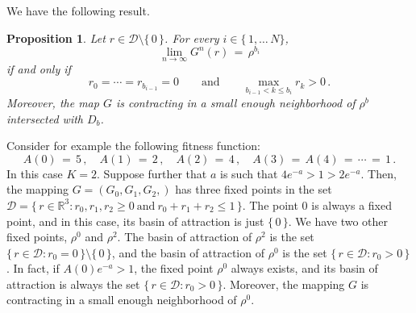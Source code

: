 \documentclass[a4paper,12pt]{article}
\newtheorem{proposition}[theorem]{Proposition}
\theoremstyle{definition}
\theoremstyle{remark}
\def \cD {\mathcal{D}}
\def \R {\mathbb{R}}
\def \exa {e^{-a}}
\begin{document}
We have the following result.
\begin{proposition}\label{convds}
Let $r\in\cD\setminus\lbrace\,0\,\rbrace$. For every $i\in\lbrace\,1,\dots\,N\rbrace$,
$$\lim_{n\to\infty}G^n(r)\,=\,\rho^{b_i}$$
if and only if
$$r_0=\cdots=r_{b_{i-1}}=0\qquad\text{and}\qquad
\max_{b_{i-1}<k\leq b_i}r_k>0\,.$$
Moreover, the map $G$ 
is contracting in a small enough neighborhood of $\rho^b$ intersected with $D_b$.
\end{proposition}
Consider for example the following fitness function:
$$A(0)\,=\,5\,,\quad
A(1)\,=\,2\,,\quad
A(2)\,=\,4\,,\quad
A(3)\,=\,A(4)\,=\,\cdots\,=\,1\,.$$
In this case $K=2$.
Suppose further that $a$ is such that $4\exa>1>2\exa$.
Then, the mapping $G=(G_0,G_1,G_2,)$ has three fixed points 
in the set $\cD=\lbrace\,
r\in\R^3:r_0,r_1,r_2\geq0\ \text{and}\ r_0+r_1+r_2\leq 1
\,\rbrace$.
The point $0$ is always a fixed point,
and in this case, its basin of attraction is just $\lbrace\,0\,\rbrace$.
We have two other fixed points, $\rho^0$ and $\rho^2$.
The basin of attraction of $\rho^2$ is the set 
$\lbrace\,r\in\cD:r_0=0\,\rbrace\setminus\lbrace\,0\,\rbrace$,
and the basin of attraction of $\rho^0$ is the set $\lbrace\,r\in\cD:r_0>0\,\rbrace$.
In fact, if $A(0)\exa>1$, the fixed point 
$\rho^0$ always exists, and its basin of attraction is always the set
$\lbrace\,r\in\cD:r_0>0\,\rbrace$.
Moreover,
the mapping $G$ is contracting in a small enough neighborhood of $\rho^0$.
\end{document}
